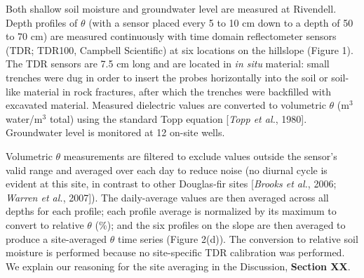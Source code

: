 Both shallow soil moisture and groundwater level are measured at Rivendell.  Depth profiles of $\theta$ (with a sensor placed every 5 to 10 cm down to a depth of 50 to 70 cm) are measured continuously with time domain reflectometer sensors (TDR; TDR100, Campbell Scientific) at six locations on the hillslope (Figure 1).  The TDR sensors are 7.5 cm long and are located in \textit{in situ} material: small trenches were dug in order to insert the probes horizontally into the soil or soil-like material in rock fractures, after which the trenches were backfilled with excavated material.  Measured dielectric values are converted to volumetric $\theta$ (m$^3$ water/m$^3$ total) using the standard Topp equation [\textit{Topp et al.}, 1980].  Groundwater level is monitored at 12 on-site wells.

Volumetric $\theta$ measurements are filtered to exclude values outside the sensor's valid range and averaged over each day to reduce noise (no diurnal cycle is evident at this site, in contrast to other Douglas-fir sites [\textit{Brooks et al.}, 2006; \textit{Warren et al.}, 2007]).  The daily-average values are then averaged across all depths for each profile; each profile average is normalized by its maximum to convert to relative $\theta$ (\%); and the six profiles on the slope are then averaged to produce a site-averaged $\theta$ time series (Figure 2(d)).  The conversion to relative soil moisture is performed because no site-specific TDR calibration was performed.  We explain our reasoning for the site averaging in the Discussion, \textbf{Section XX}.

